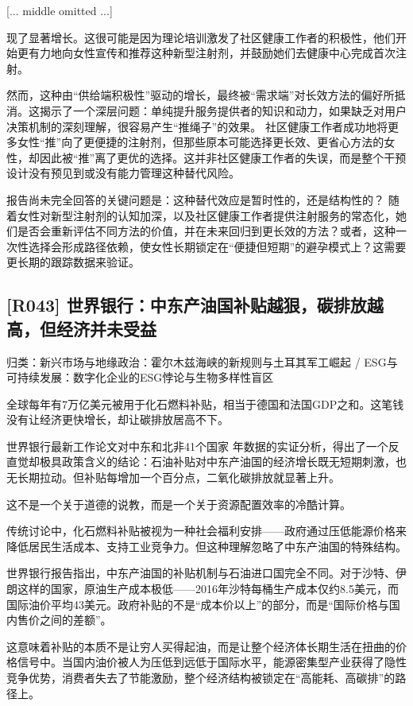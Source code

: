 \documentclass[11pt]{ctexart}
\begin{document}
[... middle omitted ...]

现了显著增长。这很可能是因为理论培训激发了社区健康工作者的积极性，他们开始更有力地向女性宣传和推荐这种新型注射剂，并鼓励她们去健康中心完成首次注射。

然而，这种由“供给端积极性”驱动的增长，最终被“需求端”对长效方法的偏好所抵消。这揭示了一个深层问题：单纯提升服务提供者的知识和动力，如果缺乏对用户决策机制的深刻理解，很容易产生“推绳子”的效果。 社区健康工作者成功地将更多女性“推”向了更便捷的注射剂，但那些原本可能选择更长效、更省心方法的女性，却因此被“推”离了更优的选择。这并非社区健康工作者的失误，而是整个干预设计没有预见到或没有能力管理这种替代风险。

报告尚未完全回答的关键问题是：这种替代效应是暂时性的，还是结构性的？ 随着女性对新型注射剂的认知加深，以及社区健康工作者提供注射服务的常态化，她们是否会重新评估不同方法的价值，并在未来回归到更长效的方法？或者，这种一次性选择会形成路径依赖，使女性长期锁定在“便捷但短期”的避孕模式上？这需要更长期的跟踪数据来验证。

\subsection{[R043] 世界银行：中东产油国补贴越狠，碳排放越高，但经济并未受益}
{\small\color{refgray}归类：新兴市场与地缘政治：霍尔木兹海峡的新规则与土耳其军工崛起 / ESG与可持续发展：数字化企业的ESG悖论与生物多样性盲区}

全球每年有7万亿美元被用于化石燃料补贴，相当于德国和法国GDP之和。这笔钱没有让经济更快增长，却让碳排放居高不下。

世界银行最新工作论文对中东和北非41个国家 年数据的实证分析，得出了一个反直觉却极具政策含义的结论：石油补贴对中东产油国的经济增长既无短期刺激，也无长期拉动。但补贴每增加一个百分点，二氧化碳排放就显著上升。

这不是一个关于道德的说教，而是一个关于资源配置效率的冷酷计算。

传统讨论中，化石燃料补贴被视为一种社会福利安排——政府通过压低能源价格来降低居民生活成本、支持工业竞争力。但这种理解忽略了中东产油国的特殊结构。

世界银行报告指出，中东产油国的补贴机制与石油进口国完全不同。对于沙特、伊朗这样的国家，原油生产成本极低——2016年沙特每桶生产成本仅约8.5美元，而国际油价平均43美元。政府补贴的不是“成本价以上”的部分，而是“国际价格与国内售价之间的差额”。

这意味着补贴的本质不是让穷人买得起油，而是让整个经济体长期生活在扭曲的价格信号中。当国内油价被人为压低到远低于国际水平，能源密集型产业获得了隐性竞争优势，消费者失去了节能激励，整个经济结构被锁定在“高能耗、高碳排”的路径上。
\end{document}
